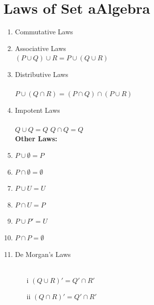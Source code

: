 \documentclass[12pt]{report}
\begin{document}
\section*{Laws of Set aAlgebra}
    \begin{enumerate}
        \item Commutative Laws \\
        \item Associative Laws \\
        $(P \cup Q) \cup R = P \cup (Q \cup R)$
        \item Distributive Laws \\
            \\
        $P \cup (Q \cap R) = (P \cap Q) \cap (P \cup R)$        
        \item Impotent Laws \\
            \\
            $Q \cup Q = Q$  $Q \cap Q = Q$\\
            \textbf{Other Laws: } \\
        \item $P \cup \emptyset = P$ \\
        \item $P \cap \emptyset = \emptyset$ \\
        \item $P \cup U = U$ \\
        \item $P \cap U = P$ \\
        \item $P \cup P' = U$\\
        \item $P \cap P = \emptyset$\\
        \item De Morgan's Laws\\
            \\
            \begin{itemize}
                \item[i] $(Q \cup R)' = Q' \cap R'$
                \item[ii] $(Q \cap R)' = Q' \cap R'$
            \end{itemize}
    \end{enumerate}
\end{document}
